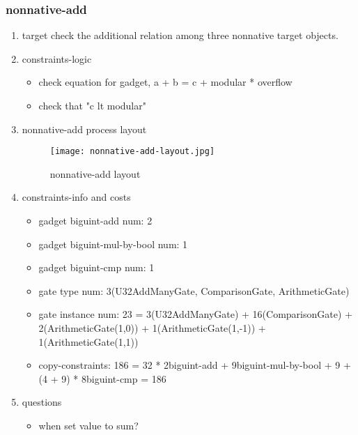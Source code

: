 \subsubsection{nonnative-add}
\label{nonnative-add}

\begin{enumerate}
    \item target
        check the additional relation among three nonnative target objects.
    \item constraints-logic
        \begin{itemize}
            \item check equation for gadget,  a + b = c + modular * overflow
            \item check that "c lt modular"
        \end{itemize}
    \item nonnative-add process layout
        \begin{figure}[!ht]
            \centering
            \texttt{[image: nonnative-add-layout.jpg]}
            \caption{nonnative-add layout}
            \label{fig:nonnative-add-layout}
        \end{figure}
    
    \item constraints-info and costs
        \begin{itemize}
            \item gadget biguint-add num: 2
            \item gadget biguint-mul-by-bool num: 1
            \item gadget biguint-cmp num: 1
            \item gate type num: 3(U32AddManyGate, ComparisonGate, ArithmeticGate)
            \item gate instance num: 23 = 3(U32AddManyGate) + 16(ComparisonGate) + 2(ArithmeticGate(1,0)) + 1(ArithmeticGate(1,-1)) + 1(ArithmeticGate(1,1))
            \item copy-constraints: 186 = 32 * 2{biguint-add} + 9{biguint-mul-by-bool} + 9 + (4 + 9) * 8{biguint-cmp} = 186
        \end{itemize}

    \item questions
        \begin{itemize}
            \item when set value to sum?
        \end{itemize}

\end{enumerate}